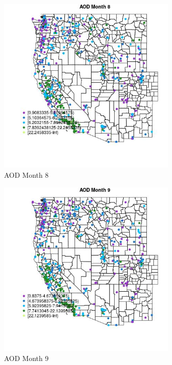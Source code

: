 \begin{figure} 
\centering  
\includegraphics[width=0.77\textwidth]{Code_Outputs/ML_input_report_ML_input_PM25_Step5_part_d_de_duplicated_aves_ML_input_MapObsMo8AOD.jpg} 
\caption{\label{fig:ML_input_report_ML_input_PM25_Step5_part_d_de_duplicated_aves_ML_inputMapObsMo8AOD}AOD Month 8} 
\end{figure} 
 

\begin{figure} 
\centering  
\includegraphics[width=0.77\textwidth]{Code_Outputs/ML_input_report_ML_input_PM25_Step5_part_d_de_duplicated_aves_ML_input_MapObsMo9AOD.jpg} 
\caption{\label{fig:ML_input_report_ML_input_PM25_Step5_part_d_de_duplicated_aves_ML_inputMapObsMo9AOD}AOD Month 9} 
\end{figure} 
 

